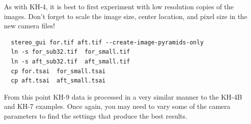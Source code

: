 As with KH-4, it is best to first experiment with low resolution copies of the images.
Don't forget to scale the image size, center location, and pixel size in the new camera files!

\begin{verbatim}
  stereo_gui for.tif aft.tif --create-image-pyramids-only
  ln -s for_sub32.tif  for_small.tif
  ln -s aft_sub32.tif  aft_small.tif
  cp for.tsai  for_small.tsai
  cp aft.tsai  aft_small.tsai
\end{verbatim}

From this point KH-9 data is processed in a very similar manner to the KH-4B and KH-7 examples.
Once again, you may need to vary some of the camera parameters to find the settings that
produce the best results.
